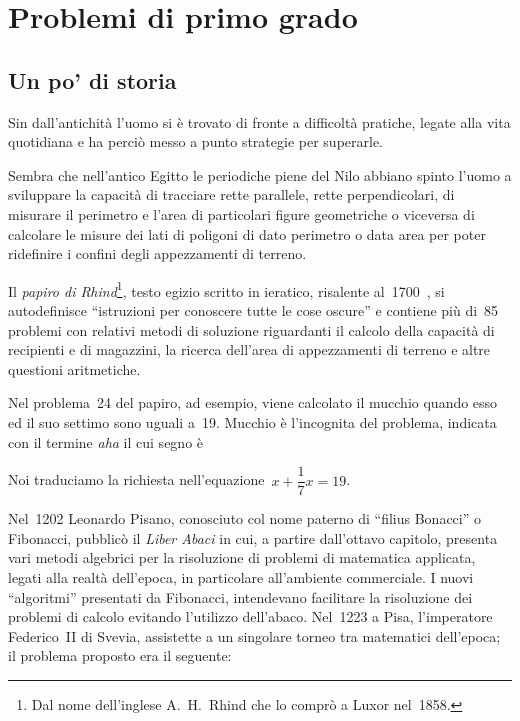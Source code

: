 
\chapter{Problemi di primo grado}

\section{Un po' di storia}

Sin dall'antichità l'uomo si è
trovato di fronte a difficoltà pratiche, legate alla vita quotidiana
e ha perciò messo a punto strategie per superarle.

Sembra che nell'antico Egitto le periodiche piene del
Nilo abbiano spinto l'uomo a sviluppare la capacità
di tracciare rette parallele, rette perpendicolari, di misurare il
perimetro e l'area di particolari figure geometriche o
viceversa di calcolare le misure dei lati di poligoni di dato perimetro
o data area per poter ridefinire i confini degli appezzamenti di
terreno.

Il \emph{papiro di Rhind}\footnote{Dal nome dell'inglese A.~H.~Rhind che lo comprò a Luxor nel~1858.}, testo egizio scritto in
ieratico, risalente al~1700~\aC, si autodefinisce
``istruzioni per conoscere tutte le cose
oscure'' e contiene più di~85 problemi con relativi
metodi di soluzione riguardanti il calcolo della capacità di
recipienti e di magazzini, la ricerca dell'area di
appezzamenti di terreno e altre questioni aritmetiche.

Nel problema~24 del papiro, ad esempio, viene calcolato il mucchio
quando esso ed il suo settimo sono uguali a~19. Mucchio è
l'incognita del problema, indicata con il termine
\emph{aha} il cui segno è


Noi traduciamo la richiesta nell'equazione~$x+\dfrac{1}{7}x=19$.

Nel~1202 Leonardo Pisano, conosciuto col nome paterno di
``filius Bonacci'' o Fibonacci, pubblicò il
\emph{Liber Abaci} in cui, a partire dall'ottavo
capitolo, presenta vari metodi algebrici per la risoluzione di problemi
di matematica applicata, legati alla realtà
dell'epoca, in particolare
all'ambiente commerciale. I nuovi
``algoritmi'' presentati da Fibonacci,
intendevano facilitare la risoluzione dei problemi di calcolo evitando
l'utilizzo dell'abaco. Nel~1223 a
Pisa, l'imperatore Federico~II di Svevia, assistette a
un singolare torneo tra matematici dell'epoca; il
problema proposto era il seguente:


